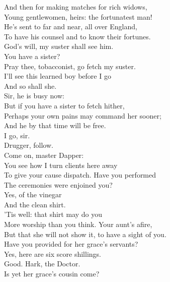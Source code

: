\documentclass[a4paper,oneside,12pt]{memoir}
\begin{document}
\begin{drama*}
And then for making matches for rich widows,\\
Young gentlewomen, heirs: the fortunatest man!\\
He's sent to far and near, all over England,\\
To have his counsel and to know their fortunes.\\
\kastrilspeaks God's will, my suster shall see him.\\
\facespeaks {} You have a sister?\\
\kastrilspeaks Pray thee, tobacconist, go fetch my suster.\\
I'll see this learned boy before I go\\
And so shall she.\\
\facespeaks {} Sir, he is busy now:\\
But if you have a sister to fetch hither,\\
Perhaps your own pains may command her sooner;\\
And he by that time will be free.\\
\kastrilspeaks {} I go, sir.\\
\facespeaks Drugger, follow.\\
 Come on, master Dapper:\\
You see how I turn clients here away\\
To give your cause dispatch. Have you performed\\
The ceremonies were enjoined you?\\
\dapperspeaks {} Yes, of the vinegar\\
And the clean shirt.\\
\facespeaks {} 'Tis well: that shirt may do you\\
More worship than you think. Your aunt's afire,\\
But that she will not show it, to have a sight of you.\\
Have you provided for her grace's servants?\\
\dapperspeaks Yes, here are six score shillings.\\
\facespeaks {} Good. Hark, the Doctor.\\
\subtlespeaks Is yet her grace's cousin come?\\

\end{drama*}
\end{document}
